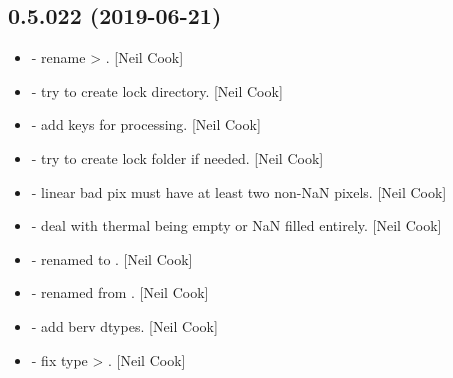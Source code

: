 \documentclass[a4paper,10pt,english]{report}
\begin{document}
\subsection{0.5.022 (2019-06-21)}
\label{\detokenize{misc/changelog:id115}}\begin{itemize}
\item {} 
 - rename  \textendash{}\textgreater{} . {[}Neil Cook{]}

\item {} 
 - try to create lock directory. {[}Neil Cook{]}

\item {} 
 - add keys for processing. {[}Neil Cook{]}

\item {} 
 - try to create lock folder if needed. {[}Neil Cook{]}

\item {} 
 - linear bad pix must have at least two non-NaN pixels.
{[}Neil Cook{]}

\item {} 
 - deal with thermal being empty or NaN filled entirely.
{[}Neil Cook{]}

\item {} 
 - renamed  to . {[}Neil
Cook{]}

\item {} 
 - renamed from . {[}Neil Cook{]}

\item {} 
 - add berv dtypes. {[}Neil Cook{]}

\item {} 
 - fix type  \textendash{}\textgreater{} . {[}Neil
Cook{]}

\end{itemize}
\end{document}
